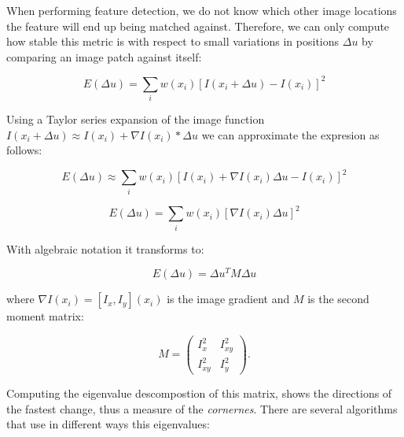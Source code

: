 \documentclass[12pt, a4paper, titlepage,twoside,openright]{article}
\begin{document}

When performing feature detection, we do not know which other image locations the feature will end up being matched against. Therefore, we can only compute how stable this metric is with respect to small variations in positions $\Delta u$ by comparing an image patch against itself:

$$ E( \Delta u) = \sum_{i} w(x_{i}) [I(x_{i}+\Delta u)-I(x_{i})]^{2}$$

Using a Taylor series expansion of the image function $I(x_{i}+\Delta u) \approx I(x_{i}) + \nabla I(x_{i})*\Delta u  $ we can approximate the expresion as follows:

$$ E( \Delta u) \approx \sum_{i} w(x_{i}) [I(x_{i})+\nabla I(x_{i}) \Delta u-I(x_{i})]^{2}$$


$$ E( \Delta u) = \sum_{i} w(x_{i}) [\nabla I(x_{i}) \Delta u]^{2}$$

With algebraic notation it transforms to:

$$ E( \Delta u) = \Delta u^{T} M \Delta u$$

where $ \nabla I(x_{i}) = [I_{x},I_{y}](x_{i}) $ is the image gradient and $M$ is the second moment matrix:

\[ M = \left( \begin{array}{ccc}
I_{x}^{2} & I_{xy}^{2} \\
I_{xy}^{2} & I_{y}^{2} \end{array} \right).\] 

Computing the eigenvalue descompostion of this matrix, shows the directions of the fastest change, thus a measure of the \textit{cornernes}. There are several algorithms that use in different ways this eigenvalues:

%
%
%
%




\end{document}
